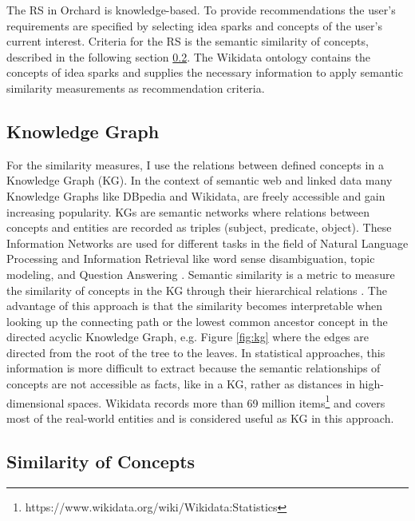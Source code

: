 \documentclass[pdftex,a4paper,12pt]{scrartcl}
\theoremstyle{definition}
\begin{document}

The RS in Orchard is knowledge-based. To provide recommendations the user's requirements are specified by selecting idea sparks and concepts of the user's current interest. Criteria for the RS is the semantic similarity of concepts, described in the following section \ref{similarity}. The Wikidata ontology contains the concepts of idea sparks and supplies the necessary information to apply semantic similarity measurements as recommendation criteria.
\subsection{Knowledge Graph}
    For the similarity measures, I use the relations between defined concepts in a Knowledge Graph (KG). In the context of semantic web and linked data many Knowledge Graphs like DBpedia and Wikidata, are freely accessible and gain increasing popularity. KGs are semantic networks where relations between concepts and entities are recorded as triples (subject, predicate, object). These Information Networks are used for different tasks in the field of Natural Language Processing and Information Retrieval like word sense disambiguation, topic modeling, and Question Answering \citep{nastase_topic-driven_2008}. 
    Semantic similarity is a metric to measure the similarity of concepts in the KG through their hierarchical relations \citep{zhu_computing_2017}. The advantage of this approach is that the similarity becomes interpretable when looking up the connecting path or the lowest common ancestor concept in the directed acyclic Knowledge Graph, e.g. Figure \ref{fig:kg} where the edges are directed from the root of the tree to the leaves. In statistical approaches, this information is more difficult to extract because the semantic relationships of concepts are not accessible as facts, like in a KG, rather as distances in high-dimensional spaces.
    Wikidata records more than 69 million items\footnote{https://www.wikidata.org/wiki/Wikidata:Statistics} and covers most of the real-world entities and is considered useful as KG in this approach. 

\subsection{Similarity of Concepts}\label{similarity}
\end{document}
